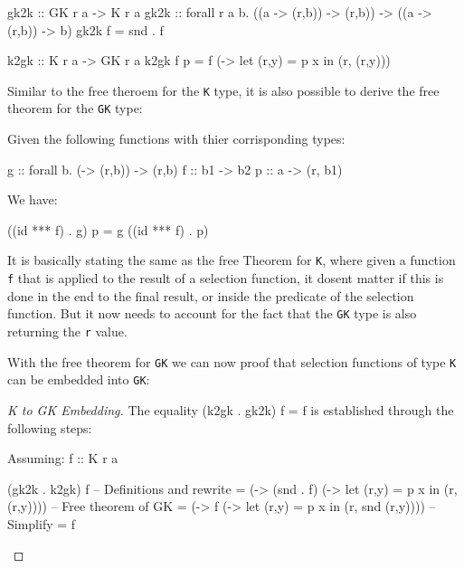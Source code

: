 \documentclass[runningheads]{llncs}
\begin{document}
\begin{code}
gk2k :: GK r a -> K r a
gk2k :: forall r a b. ((a -> (r,b)) -> (r,b)) -> ((a -> (r,b)) -> b)
gk2k f = snd . f
\end{code}

\begin{code}
k2gk :: K r a -> GK r a
k2gk f p = f (\x -> let (r,y) = p x in (r, (r,y)))
\end{code}

Similar to the free theroem for the \texttt{K} type, it is also possible
to derive the free theorem for the \texttt{GK} type:

\begin{theorem}
Given the following functions with thier corrisponding types:

\begin{haskell}
g :: forall b. (\a -> (r,b)) -> (r,b)
f :: b1 -> b2
p :: a -> (r, b1)
\end{haskell}

We have:

\begin{haskell}
((id *** f) . g) p = g ((id *** f) . p)
\end{haskell}

\end{theorem}

It is basically stating the same as the free Theorem for \texttt{K},
where given a function \texttt{f} that is applied to the result of a
selection function, it dosent matter if this is done in the end to the
final result, or inside the predicate of the selection function. But it
now needs to account for the fact that the \texttt{GK} type is also
returning the \texttt{r} value.

With the free theorem for \texttt{GK} we can now proof that selection
functions of type \texttt{K} can be embedded into \texttt{GK}:

\begin{proof}[K to GK Embedding]
The equality (k2gk . gk2k) f = f is established through the following steps:

Assuming: f :: K r a

\begin{haskell}
(gk2k . k2gk) f
-- {{ Definitions and rewrite }}
= (\p -> (snd . f) (\x -> let (r,y) = p x in (r, (r,y)))) 
-- {{ Free theorem of GK }}
= (\p -> f (\x -> let (r,y) = p x in (r, snd (r,y))))
-- {{ Simplify }}
= f
\end{haskell}
\end{proof}
\end{document}
